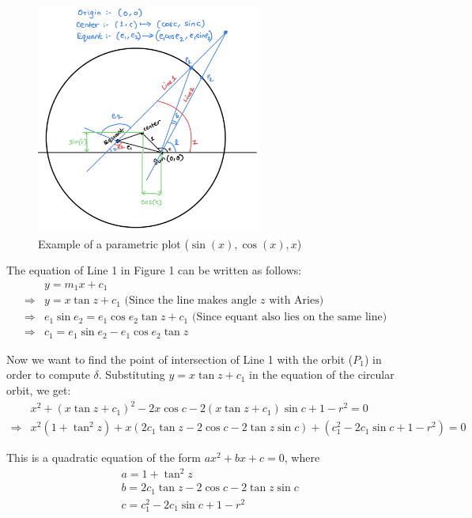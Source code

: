 \documentclass[11pt]{article}
\begin{document}
\begin{figure}[h]
\centering
\includegraphics[width=0.66\textwidth]{file}
\caption{Example of a parametric plot ($\sin (x), \cos(x), x$)}
\end{figure}

The equation of Line 1 in Figure 1 can be written as follows:
\begin{align*}
 & y = m_1 x + c_1 \\
\Rightarrow & y = x \tan{z} + c_1 \text{     (Since the line makes angle $z$ with Aries)} \\
\Rightarrow & e_1 \sin{e_2} = e_1 \cos{e_2} \tan{z} + c_1 \text{    (Since equant also lies on the same line)} \\
\Rightarrow & c_1 = e_1 \sin{e_2} - e_1 \cos{e_2} \tan{z}
\end{align*}

Now we want to find the point of intersection of Line 1 with the orbit ($P_1$) in order to compute $\delta$. Substituting $y = x \tan{z} + c_1$ in the equation of the circular orbit, we get:
\begin{align*}
    & x^2 + (x \tan{z} + c_1)^2 - 2x\cos{c} - 2(x \tan{z} + c_1) \sin{c} + 1 - r^2 = 0 \\ 
    \Rightarrow & x^2 (1 + \tan^2{z}) + x (2 c_1 \tan{z} - 2 \cos{c} - 2\tan{z}\sin{c}) + (c_1^2 - 2 c_1 \sin{c} + 1 - r^2) = 0
\end{align*}

This is a quadratic equation of the form $ax^2 + bx + c = 0$, where
\begin{align*}
    & a = 1 + \tan^2{z} \\
    & b = 2 c_1 \tan{z} - 2 \cos{c} - 2\tan{z}\sin{c} \\
    & c = c_1^2 - 2 c_1 \sin{c} + 1 - r^2
\end{align*}
\end{document}
